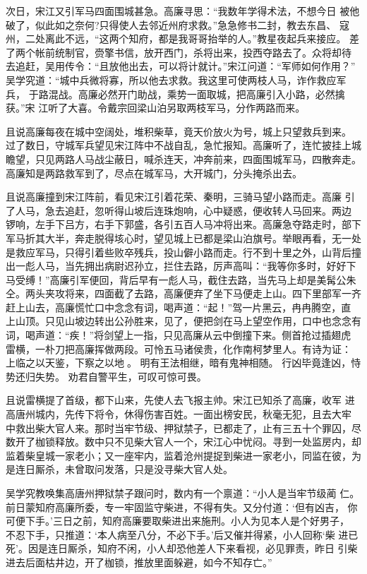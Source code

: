 次日，宋江又引军马四面围城甚急。高廉寻思：“我数年学得术法，不想今日
被他破了，似此如之奈何?只得使人去邻近州府求救。”急急修书二封，教去东昌、
寇州，二处离此不远，“这两个知府，都是我哥哥抬举的人。”教星夜起兵来接应。
差了两个帐前统制官，赍擎书信，放开西门，杀将出来，投西夺路去了。众将却待
去追赶，吴用传令：“且放他出去，可以将计就计。”宋江问道：“军师如何作用？”
吴学究道：“城中兵微将寡，所以他去求救。我这里可使两枝人马，诈作救应军兵，
于路混战。高廉必然开门助战，乘势一面取城，把高廉引入小路，必然擒获。”宋
江听了大喜。令戴宗回梁山泊另取两枝军马，分作两路而来。

且说高廉每夜在城中空阔处，堆积柴草，竟天价放火为号，城上只望救兵到来。
过了数日，守城军兵望见宋江阵中不战自乱，急忙报知。高廉听了，连忙披挂上城
瞻望，只见两路人马战尘蔽日，喊杀连天，冲奔前来，四面围城军马，四散奔走。
高廉知是两路救军到了，尽点在城军马，大开城门，分头掩杀出去。

且说高廉撞到宋江阵前，看见宋江引着花荣、秦明，三骑马望小路而走。高廉
引了人马，急去追赶，忽听得山坡后连珠炮响，心中疑惑，便收转人马回来。两边
锣响，左手下吕方，右手下郭盛，各引五百人马冲将出来。高廉急夺路走时，部下
军马折其大半，奔走脱得垓心时，望见城上已都是梁山泊旗号。举眼再看，无一处
是救应军马，只得引着些败卒残兵，投山僻小路而走。行不到十里之外，山背后撞
出一彪人马，当先拥出病尉迟孙立，拦住去路，厉声高叫：“我等你多时，好好下
马受缚！”高廉引军便回，背后早有一彪人马，截住去路，当先马上却是美髯公朱
仝。两头夹攻将来，四面截了去路，高廉便弃了坐下马便走上山。四下里部军一齐
赶上山去，高廉慌忙口中念念有词，喝声道：“起！”驾一片黑云，冉冉腾空，直
上山顶。只见山坡边转出公孙胜来，见了，便把剑在马上望空作用，口中也念念有
词，喝声道：“疾！”将剑望上一指，只见高廉从云中倒撞下来。侧首抢过插翅虎
雷横，一朴刀把高廉挥做两段。可怜五马诸侯贵，化作南柯梦里人。有诗为证：
上临之以天鉴，下察之以地。
明有王法相继，暗有鬼神相随。
行凶毕竟逢凶，恃势还归失势。
劝君自警平生，可叹可惊可畏。

且说雷横提了首级，都下山来，先使人去飞报主帅。宋江已知杀了高廉，收军
进高唐州城内，先传下将令，休得伤害百姓。一面出榜安民，秋毫无犯，且去大牢
中救出柴大官人来。那时当牢节级、押狱禁子，已都走了，止有三五十个罪囚，尽
数开了枷锁释放。数中只不见柴大官人一个，宋江心中忧闷。寻到一处监房内，却
监着柴皇城一家老小；又一座牢内，监着沧州提捉到柴进一家老小，同监在彼，为
是连日厮杀，未曾取问发落，只是没寻柴大官人处。

吴学究教唤集高唐州押狱禁子跟问时，数内有一个禀道：“小人是当牢节级蔺
仁。前日蒙知府高廉所委，专一牢固监守柴进，不得有失。又分付道：‘但有凶吉，
你可便下手。’三日之前，知府高廉要取柴进出来施刑。小人为见本人是个好男子，
不忍下手，只推道：‘本人病至八分，不必下手。’后又催并得紧，小人回称‘柴
进已死’。因是连日厮杀，知府不闲，小人却恐他差人下来看视，必见罪责，昨日
引柴进去后面枯井边，开了枷锁，推放里面躲避，如今不知存亡。”

